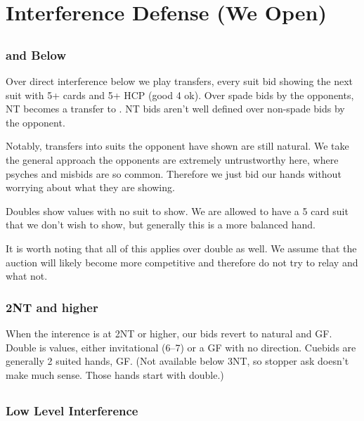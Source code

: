 \documentclass[tom-ari]{subfile}
\begin{document}
	
\chapter{Interference Defense (We Open)}
	
	\section[1C]{}
	
		\subsection[2S and Below]{ and Below}
		
		Over direct interference below  we play transfers, every suit bid showing the next suit with 5+ cards and 5+ HCP (good 4 ok). Over spade bids by the opponents, NT becomes a transfer to \clubsuit. NT bids aren't well defined over non-spade bids by the opponent. 
		
		Notably, transfers into suits the opponent have shown are still natural. We take the general approach the opponents are extremely untrustworthy here, where psyches and misbids are so common. Therefore we just bid our hands without worrying about what they are showing.
		
		Doubles show values with no suit to show. We are allowed to have a 5 card suit that we don't wish to show, but generally this is a more balanced hand.
	
		It is worth noting that all of this applies over double as well. We assume that the auction will likely become more competitive and therefore do not try to relay and what not. 
		
		\subsection{2NT and higher}
		
		When the interence is at 2NT or higher, our bids revert to natural and GF. Double is values, either invitational (6--7) or a GF with no direction. Cuebids are generally 2 suited hands, GF. (Not available below 3NT, so stopper ask doesn't make much sense. Those hands start with double.)
	
	\section[1D]{}
	
		\subsection{Low Level Interference}
	
\end{document}
